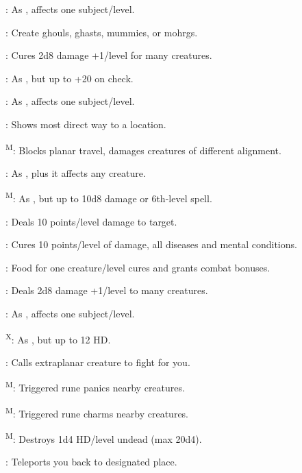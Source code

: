 : As , affects one subject/level.

: Create ghouls, ghasts, mummies, or mohrgs.

: Cures 2d8 damage +1/level for many creatures.

: As , but up to +20 on check.

: As , affects one subject/level.

: Shows most direct way to a location.

\textsuperscript{M}: Blocks planar travel, damages creatures of different alignment.

: As , plus it affects any creature.

\textsuperscript{M}: As , but up to 10d8 damage or 6th-level spell.

: Deals 10 points/level damage to target.

: Cures 10 points/level of damage, all diseases and mental conditions.

: Food for one creature/level cures and grants combat bonuses.

: Deals 2d8 damage +1/level to many creatures.

: As , affects one subject/level.

\textsuperscript{X}: As , but up to 12 HD.

: Calls extraplanar creature to fight for you.

\textsuperscript{M}: Triggered rune panics nearby creatures.

\textsuperscript{M}: Triggered rune charms nearby creatures.

\textsuperscript{M}: Destroys 1d4 HD/level undead (max 20d4).


: Teleports you back to designated place.



